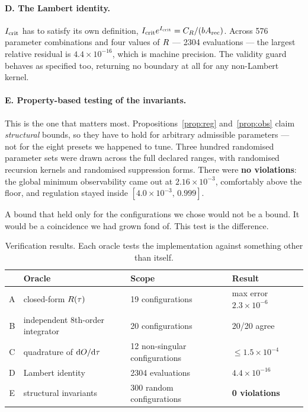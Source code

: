 \paragraph{D. The Lambert identity.}
$I_{\mathrm{crit}}$ has to satisfy its own definition, $I_{\mathrm{crit}} e^{I_{\mathrm{crit}}} = C_R/(bA_{\mathrm{rec}})$.
Across 576 parameter combinations and four values of $R$ --- 2304 evaluations
--- the largest relative residual is $4.4\times10^{-16}$, which is machine
precision. The validity guard behaves as specified too, returning no boundary at
all for any non-Lambert kernel.

\paragraph{E. Property-based testing of the invariants.}
This is the one that matters most. Propositions~\ref{prop:reg}
and~\ref{prop:obs} claim \emph{structural} bounds, so they have to hold for
arbitrary admissible parameters --- not for the eight presets we happened to
tune. Three hundred randomised parameter sets were drawn across the full
declared ranges, with randomised recursion kernels and randomised suppression
forms. There were \textbf{no violations}: the global minimum observability came
out at $2.16\times10^{-3}$, comfortably above the floor, and regulation stayed
inside $[4.0\times10^{-3},\,0.999]$.

A bound that held only for the configurations we chose would not be a bound. It
would be a coincidence we had grown fond of. This test is the difference.

\begin{table}[tb]
\centering\small
\caption{Verification results. Each oracle tests the implementation against
something other than itself.}
\label{tab:verification}
\begin{tabular}{@{}clll@{}}
\toprule
 & Oracle & Scope & Result \\
\midrule
A & closed-form $R(\tau)$              & 19 configurations & max error $2.3\times10^{-6}$ \\
B & independent 8th-order integrator      & 20 configurations & 20/20 agree \\
C & quadrature of $\mathrm{d}O/\mathrm{d}\tau$ & 12 non-singular configurations & $\leq 1.5\times10^{-4}$ \\
D & Lambert identity                      & 2304 evaluations  & $4.4\times10^{-16}$ \\
E & structural invariants                 & 300 random configurations & \textbf{0 violations} \\
\bottomrule
\end{tabular}
\end{table}

